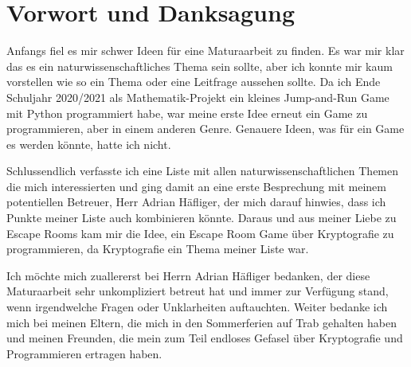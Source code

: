 \section{Vorwort und Danksagung}
\label{sec:vorwort}

Anfangs fiel es mir schwer Ideen für eine Maturaarbeit zu finden. Es war mir klar das es ein naturwissenschaftliches Thema sein sollte, aber ich konnte mir kaum vorstellen wie so ein Thema oder eine Leitfrage aussehen sollte. Da ich Ende Schuljahr 2020/2021 als Mathematik-Projekt ein kleines Jump-and-Run Game mit Python programmiert habe, war meine erste Idee erneut ein Game zu programmieren, aber in einem anderen Genre. Genauere Ideen, was für ein Game es werden könnte, hatte ich nicht.

Schlussendlich verfasste ich eine Liste mit allen naturwissenschaftlichen Themen die mich interessierten und ging damit an eine erste Besprechung mit meinem potentiellen Betreuer, Herr Adrian Häfliger, der mich darauf hinwies, dass ich Punkte meiner Liste auch kombinieren könnte. Daraus und aus meiner Liebe zu Escape Rooms kam mir die Idee, ein Escape Room Game über Kryptografie zu programmieren, da Kryptografie ein Thema meiner Liste war.

Ich möchte mich zuallererst bei Herrn Adrian Häfliger bedanken, der diese Maturaarbeit sehr unkompliziert betreut hat und immer zur Verfügung stand, wenn irgendwelche Fragen oder Unklarheiten auftauchten. Weiter bedanke ich mich bei meinen Eltern, die mich in den Sommerferien auf Trab gehalten haben und meinen Freunden, die mein zum Teil endloses Gefasel über Kryptografie und Programmieren ertragen haben.